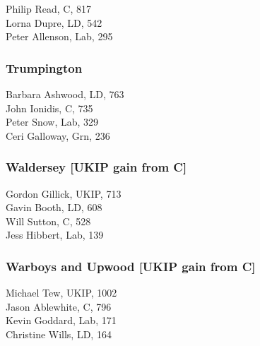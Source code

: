 \documentclass[a4paper,openany,10pt]{book}
\begin{document}


Philip Read, C, 817\\
Lorna Dupre, LD, 542\\
Peter Allenson, Lab, 295\\


\subsubsection*{Trumpington}



Barbara Ashwood, LD, 763\\
John Ionidis, C, 735\\
Peter Snow, Lab, 329\\
Ceri Galloway, Grn, 236\\


\subsubsection*{Waldersey \hspace*{\fill}\nolinebreak[1]%
\enspace\hspace*{\fill}
[UKIP gain from C]}



Gordon Gillick, UKIP, 713\\
Gavin Booth, LD, 608\\
Will Sutton, C, 528\\
Jess Hibbert, Lab, 139\\


\subsubsection*{Warboys and Upwood \hspace*{\fill}\nolinebreak[1]%
\enspace\hspace*{\fill}
[UKIP gain from C]}



Michael Tew, UKIP, 1002\\
Jason Ablewhite, C, 796\\
Kevin Goddard, Lab, 171\\
Christine Wills, LD, 164\\
\end{document}
